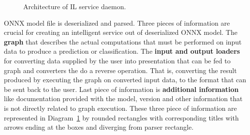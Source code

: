 \documentclass[english, 12pt, a4paper, elec, utf8, online]{aaltothesis}
\begin{document}
\usetikzlibrary{shapes.misc} 
\begin{figure}[h!]
\centering
{}

\caption{Architecture of IL service daemon.}\label{fig:il_architecture}
\end{figure}

ONNX model file is deserialized and parsed. Three pieces of information are crucial for creating an intelligent service out of deserialized ONNX model. The \textbf{graph} that describes the actual computations that must be performed on input data to produce a prediction or classification. The \textbf{input and output loaders} for converting data supplied by the user into presentation that can be fed to graph and converters the do a reverse operation. That is, converting the result produced by executing the graph on converted input data, to the format that can be sent back to the user. Last piece of information is \textbf{additional information} like documentation provided with the model, version and other information that is not directly related to graph execution. These three piece of information are represented in Diagram~\ref{fig:il_architecture} by rounded rectangles with corresponding titles with arrows ending at the boxes and diverging from parser rectangle. 
\end{document}
